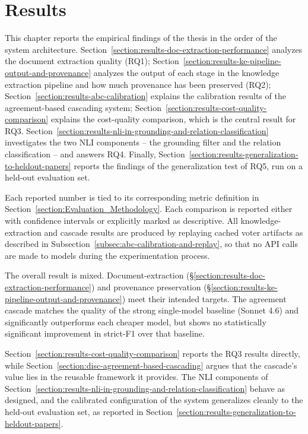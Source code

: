 
\chapter{Results}\label{chapter:Results}

This chapter reports the empirical findings of the thesis in the order of the system architecture. Section~\ref{section:results-doc-extraction-performance} analyzes the document extraction quality (RQ1); Section~\ref{section:results-ke-pipeline-output-and-provenance} analyzes the output of each stage in the knowledge extraction pipeline and how much provenance has been preserved (RQ2); Section~\ref{section:results-abc-calibration} explains the calibration results of the agreement-based cascading system; Section~\ref{section:results-cost-quality-comparison} explains the cost-quality comparison, which is the central result for RQ3. Section~\ref{section:results-nli-in-grounding-and-relation-classification} investigates the two NLI components -- the grounding filter and the relation classification -- and answers RQ4. Finally, Section~\ref{section:results-generalization-to-heldout-papers} reports the findings of the generalization test of RQ5, run on a held-out evaluation set.

Each reported number is tied to its corresponding metric definition in Section~\ref{section:Evaluation_Methodology}. Each comparison is reported either with confidence intervals or explicitly marked as descriptive. All knowledge-extraction and cascade results are produced by replaying cached voter artifacts as described in Subsection~\ref{subsec:abc-calibration-and-replay}, so that no API calls are made to models during the experimentation process. 

The overall result is mixed. Document-extraction (§\ref{section:results-doc-extraction-performance}) and provenance preservation (§\ref{section:results-ke-pipeline-output-and-provenance}) meet their intended targets. The agreement cascade matches the quality of the strong single-model baseline (Sonnet 4.6) and significantly outperforms each cheaper model, but shows no statistically significant improvement in strict-F1 over that baseline.

Section~\ref{section:results-cost-quality-comparison} reports the RQ3 results directly, while Section~\ref{section:disc-agreement-based-cascading} argues that the cascade's value lies in the reusable framework it provides. The NLI components of Section~\ref{section:results-nli-in-grounding-and-relation-classification} behave as designed, and the calibrated configuration of the system generalizes cleanly to the held-out evaluation set, as reported in Section~\ref{section:results-generalization-to-heldout-papers}.






